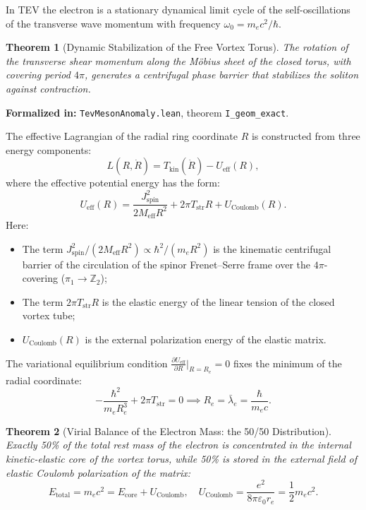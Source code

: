 \documentclass[11pt,a4paper]{article}
\providecommand{\lambdabar}{\bar{\lambda}}
\newtheorem{theorem}{Theorem}
\theoremstyle{definition}
\theoremstyle{remark}
\begin{document}
In TEV the electron is a stationary dynamical limit cycle of the self-oscillations of the transverse wave momentum with frequency $\omega_0 = m_e c^2 / \hbar$.
	
\begin{theorem}[Dynamic Stabilization of the Free Vortex Torus]
\label{thm:electron_dynamic_stabilization}
The rotation of the transverse shear momentum along the Möbius sheet of the closed torus, with covering period $4\pi$, generates a centrifugal phase barrier that stabilizes the soliton against contraction.
\end{theorem}

\noindent\small\textbf{Formalized in:} \texttt{TevMesonAnomaly.lean}, theorem \texttt{I_geom_exact}.

The effective Lagrangian of the radial ring coordinate $R$ is constructed from three energy components:
\begin{equation}
	L(R, \dot{R}) = T_{\mathrm{kin}}(\dot{R}) - U_{\mathrm{eff}}(R),
	\label{eq:electron_lagrangian}
\end{equation}
where the effective potential energy has the form:
\begin{equation}
U_{\mathrm{eff}}(R) = \frac{J_{\mathrm{spin}}^2}{2 M_{\mathrm{eff}} R^2} + 2\pi T_{\mathrm{str}} R + U_{\mathrm{Coulomb}}(R).
\label{eq:electron_effective_potential}
\end{equation}
Here:
\begin{itemize}
\item The term $J_{\mathrm{spin}}^2 / (2 M_{\mathrm{eff}} R^2) \propto \hbar^2 / (m_e R^2)$ is the kinematic centrifugal barrier of the circulation of the spinor Frenet--Serre frame over the $4\pi$-covering ($\pi_1 \to \mathbb{Z}_2$);
\item The term $2\pi T_{\mathrm{str}} R$ is the elastic energy of the linear tension of the closed vortex tube;
\item $U_{\mathrm{Coulomb}}(R)$ is the external polarization energy of the elastic matrix.
\end{itemize}
	
The variational equilibrium condition $\frac{\partial U_{\mathrm{eff}}}{\partial R}\Big|_{R = R_e} = 0$ fixes the minimum of the radial coordinate:
\begin{equation}
-\frac{\hbar^2}{m_e R_e^3} + 2\pi T_{\mathrm{str}} = 0 \implies R_e = \lambdabar_e = \frac{\hbar}{m_e c}.
\label{eq:electron_radius_equilibrium}
\end{equation}
	
\begin{theorem}[Virial Balance of the Electron Mass: the 50/50 Distribution]
\label{thm:electron_virial_balance}
Exactly 50\% of the total rest mass of the electron is concentrated in the internal kinetic-elastic core of the vortex torus, while 50\% is stored in the external field of elastic Coulomb polarization of the matrix:
\begin{equation}
	E_{\mathrm{total}} = m_e c^2 = E_{\mathrm{core}} + U_{\mathrm{Coulomb}}, \quad U_{\mathrm{Coulomb}} = \frac{e^2}{8\pi\varepsilon_0 r_e} = \frac{1}{2} m_e c^2.
	\label{eq:electron_virial_balance}
\end{equation}
\end{theorem}
\end{document}
